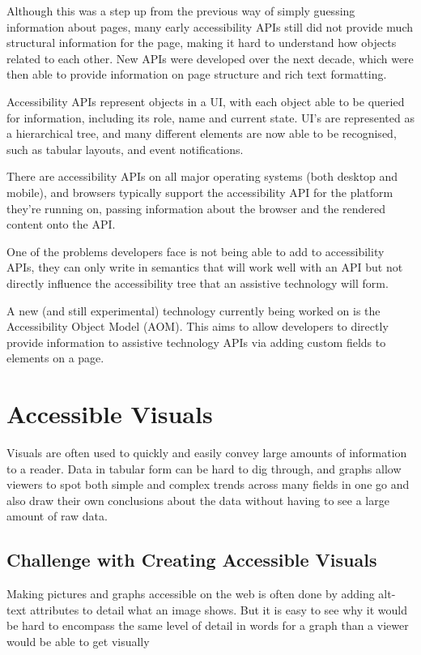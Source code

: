 \documentclass[ %
                    author={Aleena Baig},
                supervisor={Dr Simon Lock},
                    degree={BSc},
                     title={On Making Web Accessible Graphs},
                  subtitle={},
                      year={2019} ]{dissertation}
\begin{document}
Although this was a step up from the previous way of simply guessing information about pages, many early accessibility APIs still did not provide much structural information for the page, making it hard to understand how objects related to each other. New APIs were developed over the next decade, which were then able to provide information on page structure and rich text formatting.

Accessibility APIs represent objects in a UI, with each object able to be queried for information, including its role, name and current state. UI's are represented as a hierarchical tree, and many different elements are now able to be recognised, such as tabular layouts, and event notifications.

There are accessibility APIs on all major operating systems (both desktop and mobile), and browsers typically support the accessibility API for the platform they're running on, passing information about the browser and the rendered content onto the API.

One of the problems developers face is not being able to add to accessibility APIs, they can only write in semantics that will work well with an API but not directly influence the accessibility tree that an assistive technology will form.

A new (and still experimental) technology currently being worked on is the Accessibility Object Model (AOM). This aims to allow developers to directly provide information to assistive technology APIs via adding custom fields to elements on a page.

\section{Accessible Visuals}

Visuals are often used to quickly and easily convey large amounts of information to a reader. Data in tabular form can be hard to dig through, and graphs allow viewers to spot both simple and complex trends across many fields in one go and also draw their own conclusions about the data without having to see a large amount of raw data.


\subsection{Challenge with Creating Accessible Visuals}

Making pictures and graphs accessible on the web is often done by adding alt-text attributes to detail what an image shows. But it is easy to see why it would be hard to encompass the same level of detail in words for a graph than a viewer would be able to get visually
\end{document}
